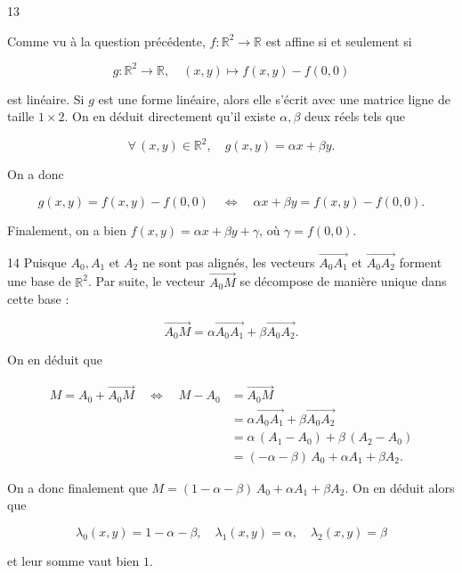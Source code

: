 \begin{reponse}{13}

Comme vu à la question précédente, $f : \mathbb{R}^2 \longrightarrow \mathbb{R}$ est affine si et seulement si 

\[
    g : \mathbb{R}^2 \longrightarrow \mathbb{R}, \quad (x,y) \longmapsto f(x,y) - f(0,0)
\]

est linéaire. Si $g$ est une forme linéaire, alors elle s'écrit avec une matrice ligne de taille $1 \times 2$. On en déduit directement qu'il existe $\alpha, \beta$ deux réels tels que 

\[
    \forall \, (x,y) \in \mathbb{R}^2, \quad g(x,y) = \alpha x + \beta y.
\]

On a donc 

\[
    g(x,y) = f(x,y) - f(0,0) \quad  \Longleftrightarrow \quad \alpha x + \beta y = f(x,y) - f(0,0).
\]

Finalement, on a bien $f(x,y) = \alpha x + \beta y + \gamma$, où $\gamma = f(0,0)$.
    
\end{reponse}


\begin{reponse}{14}
Puisque $A_0, A_1$ et $A_2$ ne sont pas alignés, les vecteurs $\overset{\rightarrow}{A_0A_1}$ et $\overset{\rightarrow}{A_0A_2}$ forment une base de $\mathbb{R}^2$. Par suite, le vecteur $\overset{\rightarrow}{A_0M}$ se décompose de manière unique dans cette base :

\[
    \overset{\rightarrow}{A_0M} = \alpha \overset{\rightarrow}{A_0A_1} + \beta \overset{\rightarrow}{A_0A_2}.
\]

On en déduit que 

\begin{align*}   
    M = A_0 + \overset{\rightarrow}{A_0M} \quad \Longleftrightarrow \quad M-A_0 & = \overset{\rightarrow}{A_0M} \\
    & = \alpha \overset{\rightarrow}{A_0A_1} + \beta \overset{\rightarrow}{A_0A_2} \\
    & = \alpha \, (A_1 - A_0) + \beta \, (A_2 - A_0) \\
    & = (-\alpha - \beta) \, A_0 + \alpha A_1 + \beta A_2.
\end{align*}

On a donc finalement que $M= (1-\alpha - \beta) \, A_0 + \alpha A_1 + \beta A_2$. On en déduit alors que 

\[
    \lambda_0(x,y) = 1-\alpha-\beta, \quad \lambda_1(x,y) = \alpha, \quad \lambda_2(x,y) = \beta
\]

et leur somme vaut bien $1$.
    
\end{reponse}

